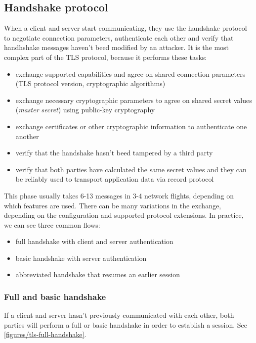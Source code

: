 \subsection{Handshake protocol}
\label{toc/tls-handshake}

When a client and server start communicating, they use the handshake protocol to negotiate connection parameters, authenticate each other and verify that handhshake messages haven't beed modified by an attacker. It is the most complex part of the TLS protocol, because it performs these tasks:

\begin{itemize}
  \item exchange supported capabilities and agree on shared connection parameters (TLS protocol version, cryptographic algorithms)
  \item exchange necessary cryptographic parameters to agree on shared secret values (\textit{master secret}) using public-key cryptography
  \item exchange certificates or other cryptographic information to authenticate one another
  \item verify that the handshake hasn't beed tampered by a third party
  \item verify that both parties have calculated the same secret values and they can be reliably used to transport application data via record protocol
\end{itemize}

This phase usually takes 6-13 messages in 3-4 network flights, depending on which features are used. There can be many variations in the exchange, depending on the configuration and supported protocol extensions. In practice, we can see three common flows:

\begin{itemize}
  \item full handshake with client and server authentication
  \item basic handshake with server authentication
  \item abbreviated handshake that resumes an earlier session
\end{itemize}

\subsubsection{Full and basic handshake}

If a client and server hasn't previously communicated with each other, both parties will perform a full or basic handshake in order to establish a session. See \autoref{figures/tls-full-handshake}.

